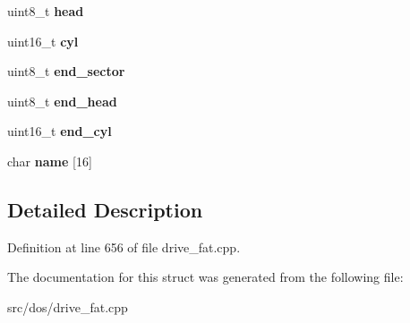 \begin{DoxyCompactItemize}
\item 
\hypertarget{struct__PC98RawPartition_a159d590fdf1918ef8ba4fa37ffbb896d}{uint8\-\_\-t {\bfseries head}}\label{struct__PC98RawPartition_a159d590fdf1918ef8ba4fa37ffbb896d}

\item 
\hypertarget{struct__PC98RawPartition_ac1a8dc3e314587ea5bceb09b1d960643}{uint16\-\_\-t {\bfseries cyl}}\label{struct__PC98RawPartition_ac1a8dc3e314587ea5bceb09b1d960643}

\item 
\hypertarget{struct__PC98RawPartition_ae9213f512993e8dd4fdbe2409ef3a402}{uint8\-\_\-t {\bfseries end\-\_\-sector}}\label{struct__PC98RawPartition_ae9213f512993e8dd4fdbe2409ef3a402}

\item 
\hypertarget{struct__PC98RawPartition_ad005cde8a52522ccc7efc9e7aa97db80}{uint8\-\_\-t {\bfseries end\-\_\-head}}\label{struct__PC98RawPartition_ad005cde8a52522ccc7efc9e7aa97db80}

\item 
\hypertarget{struct__PC98RawPartition_a23df046ffa51a15203ef87662debd38b}{uint16\-\_\-t {\bfseries end\-\_\-cyl}}\label{struct__PC98RawPartition_a23df046ffa51a15203ef87662debd38b}

\item 
\hypertarget{struct__PC98RawPartition_ac3401e613d79b53415085b2a53c34fab}{char {\bfseries name} \mbox{[}16\mbox{]}}\label{struct__PC98RawPartition_ac3401e613d79b53415085b2a53c34fab}

\end{DoxyCompactItemize}


\subsection{Detailed Description}


Definition at line 656 of file drive\-\_\-fat.\-cpp.



The documentation for this struct was generated from the following file\-:\begin{DoxyCompactItemize}
\item 
src/dos/drive\-\_\-fat.\-cpp\end{DoxyCompactItemize}

